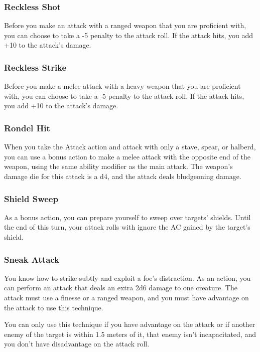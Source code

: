 \subsubsection{Reckless Shot} \label{tec::recklessshot}
Before you make an attack with a ranged weapon that you are proficient with, you can choose to take a -5 penalty to the attack roll.
If the attack hits, you add +10 to the attack's damage.

\subsubsection{Reckless Strike} \label{tec::recklessstrike}
Before you make a melee attack with a heavy weapon that you are proficient with, you can choose to take a -5 penalty to the attack roll.
If the attack hits, you add +10 to the attack's damage.

\subsubsection{Rondel Hit} \label{tec::rondelhit}
When you take the Attack action and attack with only a stave, spear, or halberd, you can use a bonus action to make a melee attack with the opposite end of the weapon, using the same ability modifier as the main attack.
The weapon's damage die for this attack is a d4, and the attack deals bludgeoning damage.

\subsubsection{Shield Sweep} \label{tec::shieldsweep}
As a bonus action, you can prepare yourself to sweep over targets' shields.
Until the end of this turn, your attack rolls with ignore the AC gained by the target's shield.

\subsubsection{Sneak Attack} \label{tec::sneakattack}
You know how to strike subtly and exploit a foe's distraction.
As an action, you can perform an attack that deals an extra 2d6 damage to one creature.
The attack must use a finesse or a ranged weapon, and you must have advantage on the attack to use this technique.

You can only use this technique if you have advantage on the attack or if another enemy of the target is within 1.5 meters of it, that enemy isn't incapacitated, and you don't have disadvantage on the attack roll.

